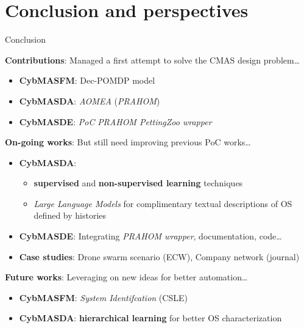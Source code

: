 \section{Conclusion and perspectives}
\begin{frame}{Conclusion}
    {}

    \begin{exampleblock}{\textbf{Contributions}: Managed a first attempt to solve the CMAS design problem\dots}

        \begin{itemize}
            \item \textbf{CybMASFM}: Dec-POMDP model
            \item \textbf{CybMASDA}: \emph{AOMEA} (\emph{PRAHOM})
            \item \textbf{CybMASDE}: \emph{PoC} \emph{PRAHOM PettingZoo wrapper}
        \end{itemize}



    \end{exampleblock}

    \begin{block}{\textbf{On-going works}: But still need improving previous PoC works\dots}

        \begin{itemize}
            \item \textbf{CybMASDA}:
                  \begin{itemize}
                      \item \textbf{supervised} and \textbf{non-supervised learning} techniques
                      \item \emph{Large Language Models} for complimentary textual descriptions of OS defined by histories
                  \end{itemize}
            \item \textbf{CybMASDE}: Integrating \emph{PRAHOM wrapper}, documentation, code\dots
            \item \textbf{Case studies}: Drone swarm scenario (ECW), Company network (journal)
        \end{itemize}

    \end{block}

    \begin{alertblock}{\textbf{Future works}: Leveraging on new ideas for better automation\dots}
        \begin{itemize}
            \item \textbf{CybMASFM}: \emph{System Identifcation} (CSLE)
            \item \textbf{CybMASDA}: \textbf{hierarchical learning} for better OS characterization

        \end{itemize}

    \end{alertblock}



\end{frame}

